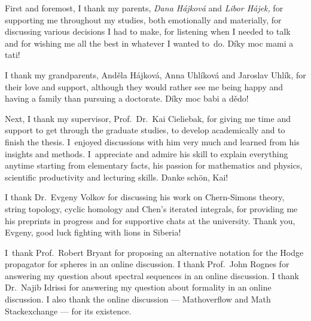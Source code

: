 \documentclass[\MainFolder/Text.tex]{subfiles}
\begin{document}
First and foremost, I thank my parents, \emph{Dana H\'ajkov\'a} and \emph{Libor H\'ajek,} for supporting me throughout my studies, both emotionally and materially, for discussing various decisions I had to make, for listening when I needed to talk and for wishing me all the best in whatever I wanted to~do.
D\'iky moc mami a tati!

I thank my grandparents,  And\v{e}la H\'ajkov\'a, Anna Uhl\'ikov\'a and Jaroslav Uhl\'ik, for their love and support, although they would rather see me being happy and having a family than pursuing a doctorate. D\'iky moc babi a d\v{e}do! 

Next, I thank my supervisor, Prof.~Dr.~Kai Cieliebak, for giving me time and support to get through the graduate studies, to develop academically and to finish the thesis. I~enjoyed discussions with him very much and learned from his insights and methods. I~appreciate and admire his skill to explain everything anytime starting from elementary facts, his passion for mathematics and physics, scientific productivity and lecturing skills. Danke sch\"on, Kai!



I thank Dr.~Evgeny Volkov for discussing his work on Chern-Simons theory, string topology, cyclic homology and Chen's iterated integrals, for providing me his preprints in progress and for supportive chats at the university. Thank you, Evgeny, good luck fighting with lions in Siberia!

I~thank Prof.~Robert Bryant for proposing an alternative notation for the Hodge propagator for spheres in an online discussion. I thank Prof.~John Rognes for answering my question about spectral sequences in an online discussion. I thank Dr.~Najib Idrissi for answering my question about formality in an online discussion. I also thank the online discussion --- Mathoverflow and Math Stackexchange --- for its existence.
\end{document}
